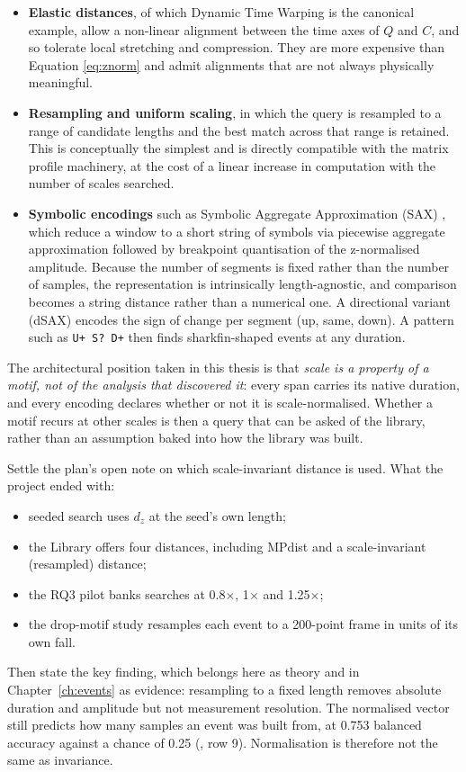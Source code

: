 \begin{itemize}
  \item \textbf{Elastic distances}, of which Dynamic Time Warping is the canonical example, allow a non-linear alignment between the time axes of $Q$ and $C$, and so tolerate local stretching and compression. They are more expensive than Equation \eqref{eq:znorm} and admit alignments that are not always physically meaningful.
  \item \textbf{Resampling and uniform scaling}, in which the query is resampled to a range of candidate lengths and the best match across that range is retained. This is conceptually the simplest and is directly compatible with the matrix profile machinery, at the cost of a linear increase in computation with the number of scales searched.
  \item \textbf{Symbolic encodings} such as Symbolic Aggregate Approximation (SAX) \cite{lin2007sax}, which reduce a window to a short string of symbols via piecewise aggregate approximation followed by breakpoint quantisation of the z-normalised amplitude. Because the number of segments is fixed rather than the number of samples, the representation is intrinsically length-agnostic, and comparison becomes a string distance rather than a numerical one. A directional variant (dSAX) encodes the sign of change per segment (up, same, down). A pattern such as \texttt{U+ S? D+} then finds sharkfin-shaped events at any duration.
\end{itemize}

The architectural position taken in this thesis is that \emph{scale is a property of a motif, not of the analysis that discovered it}: every span carries its native duration, and every encoding declares whether or not it is scale-normalised. Whether a motif recurs at other scales is then a query that can be asked of the library, rather than an assumption baked into how the library was built.

\begin{instructions}
Settle the plan's open note on which scale-invariant distance is used. What the project ended with:
\begin{itemize}
  \item seeded search uses $d_z$ at the seed's own length;
  \item the Library offers four distances, including MPdist \cite{gharghabi2018mpdist} and a scale-invariant
        (resampled) distance;
  \item the RQ3 pilot banks searches at 0.8$\times$, 1$\times$ and 1.25$\times$;
  \item the drop-motif study resamples each event to a 200-point frame in units of its own fall.
\end{itemize}
Then state the key finding, which belongs here as theory and in Chapter~\ref{ch:events} as evidence: resampling to a
fixed length removes absolute duration and amplitude but not measurement resolution. The normalised vector still
predicts how many samples an event was built from, at 0.753 balanced accuracy against a chance of 0.25
(, row 9). Normalisation is therefore not the same as invariance.
\end{instructions}


